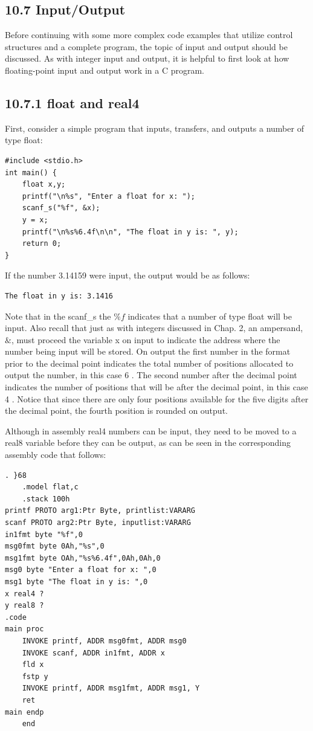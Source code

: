 \documentclass[10pt]{book}
\begin{document}
\subsection*{10.7 Input/Output}
Before continuing with some more complex code examples that utilize control structures and a complete program, the topic of input and output should be discussed. As with integer input and output, it is helpful to first look at how floating-point input and output work in a C program.

\subsection*{10.7.1 float and real4}
First, consider a simple program that inputs, transfers, and outputs a number of type float:


\begin{verbatim}
#include <stdio.h>
int main() {
    float x,y;
    printf("\n%s", "Enter a float for x: ");
    scanf_s("%f", &x);
    y = x;
    printf("\n%s%6.4f\n\n", "The float in y is: ", y);
    return 0;
}
\end{verbatim}

If the number 3.14159 were input, the output would be as follows:

\begin{verbatim}
The float in y is: 3.1416
\end{verbatim}

Note that in the scanf\_s the $\% f$ indicates that a number of type float will be input. Also recall that just as with integers discussed in Chap. 2, an ampersand, $\&$, must proceed the variable x on input to indicate the address where the number being input will be stored. On output the first number in the format prior to the decimal point indicates the total number of positions allocated to output the number, in this case 6 . The second number after the decimal point indicates the number of positions that will be after the decimal point, in this case 4 . Notice that since there are only four positions available for the five digits after the decimal point, the fourth position is rounded on output.

Although in assembly real4 numbers can be input, they need to be moved to a real8 variable before they can be output, as can be seen in the corresponding assembly code that follows:

\begin{verbatim}
. }68
    .model flat,c
    .stack 100h
printf PROTO arg1:Ptr Byte, printlist:VARARG
scanf PROTO arg2:Ptr Byte, inputlist:VARARG
in1fmt byte "%f",0
msg0fmt byte 0Ah,"%s",0
msg1fmt byte OAh,"%s%6.4f",0Ah,0Ah,0
msg0 byte "Enter a float for x: ",0
msg1 byte "The float in y is: ",0
x real4 ?
y real8 ?
.code
main proc
    INVOKE printf, ADDR msg0fmt, ADDR msg0
    INVOKE scanf, ADDR in1fmt, ADDR x
    fld x
    fstp y
    INVOKE printf, ADDR msg1fmt, ADDR msg1, Y
    ret
main endp
    end
\end{verbatim}
\end{document}
